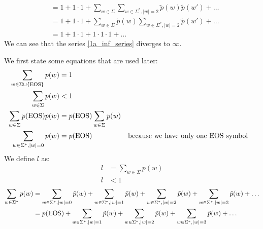 \documentclass[a4paper,12pt]{ETHexercise}
\begin{document}
\begin{question}
\begin{subquestion}
\begin{align}
			                                   & = 1 + 1 \cdot 1 + \sum_{w \in \Sigma}  \sum_{w \in \Sigma^*, |w|=2} \tilde{p}(w) \tilde{p}(w') + \dots                                                           \\
			                                   & = 1 + 1 \cdot 1 + \sum_{w \in \Sigma} \tilde{p}(w) \sum_{w \in \Sigma^*, |w|=2} \tilde{p}(w') + \dots                                                            \\
			                                   & = 1 + 1 \cdot 1 + 1 \cdot 1 \cdot 1 + \dots                                                                                                \label{1a_inf_series}
		\end{align}
		We can see that the series \eqref{1a_inf_series} diverges to $\infty$.
	\end{subquestion}
	\begin{subquestion}
		We first state some equations that are used later:
		\begin{align}
			\sum_{w \in \Sigma \cup \{\text{EOS}\}} p(w) & = 1 \label{1b_sum_p}                                                                                 \\
			\sum_{w \in \Sigma} p(w)               & < 1                                                                                                  \\
			\sum_{w \in \Sigma} p(\text{EOS})p(w)        & = p(\text{EOS}) \sum_{w \in \Sigma} p(w)                                                                   \\
			\sum_{w \in \Sigma^*, |w|=0} p(w)      & = p(\text{EOS})                          &  & \text{because we have only one EOS symbol} \label{1b_sum_p0} \\
		\end{align}
		We define $l$ as:
		\begin{align}
			l & = \sum_{w \in \Sigma} p(w) \label{1b_def_l} \\
			l & < 1
		\end{align}
		\begin{align}
			\sum_{w \in \Sigma^*} p(w) & =  \sum_{w \in \Sigma^*, |w|=0} \tilde{p}(w) + \sum_{w \in \Sigma^*, |w|=1} \tilde{p}(w) + \sum_{w \in \Sigma^*, |w|=2} \tilde{p}(w) + \sum_{w \in \Sigma^*, |w|=3} \tilde{p}(w) + \dots                       \\
			                           & = p(\eos) + \sum_{w \in \Sigma^*, |w|=1} \tilde{p}(w) + \sum_{w \in \Sigma^*, |w|=2} \tilde{p}(w) + \sum_{w \in \Sigma^*, |w|=3} \tilde{p}(w) + \dots                                                          \\

\end{align}
\end{subquestion}
\end{question}
\end{document}
